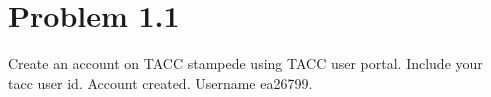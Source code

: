 \section*{Problem 1.1}
Create an account on TACC stampede using TACC user portal. Include your tacc user id.
\probline
Account created. Username ea26799.